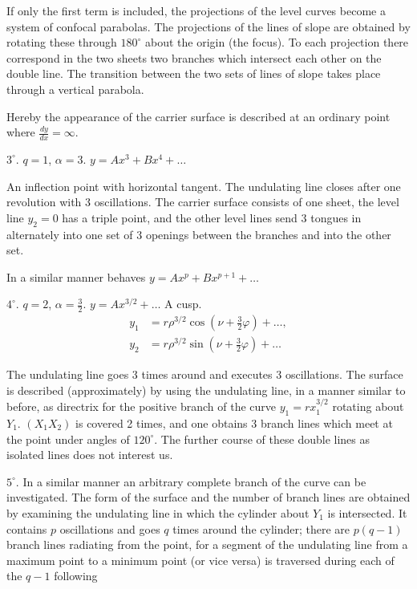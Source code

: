 \documentclass{article}
\begin{document}
If only the first term is included, the projections of the level curves become a system of confocal parabolas. The projections of the lines of slope are obtained by rotating these through $180^\circ$ about the origin (the focus). To each projection there correspond in the two sheets two branches which intersect each other on the double line. The transition between the two sets of lines of slope takes place through a vertical parabola.

Hereby the appearance of the carrier surface is described at an ordinary point where $\frac{dy}{dx} = \infty$.

$3^\circ$. $q = 1$, $\alpha = 3$. $y = A x^3 + B x^4 + \dots$

An inflection point with horizontal tangent. The undulating line closes after one revolution with 3 oscillations. The carrier surface consists of one sheet, the level line $y_2 = 0$ has a triple point, and the other level lines send 3 tongues in alternately into one set of 3 openings between the branches and into the other set.

In a similar manner behaves $y = A x^p + B x^{p+1} + \dots$

$4^\circ$. $q = 2$, $\alpha = \frac{3}{2}$. $y = A x^{3/2} + \dots$ A cusp.
\[
\begin{aligned}
y_1 &= r \rho^{3/2} \cos \left(\nu + \frac{3}{2}\varphi\right) + \dots, \\
y_2 &= r \rho^{3/2} \sin \left(\nu + \frac{3}{2}\varphi\right) + \dots
\end{aligned}
\]

The undulating line goes 3 times around and executes 3 oscillations. The surface is described (approximately) by using the undulating line, in a manner similar to before, as directrix for the positive branch of the curve $y_1 = r x_1^{3/2}$ rotating about $Y_1$. $(X_1 X_2)$ is covered 2 times, and one obtains 3 branch lines which meet at the point under angles of $120^\circ$. The further course of these double lines as isolated lines does not interest us.

$5^\circ$. In a similar manner an arbitrary complete branch of the curve can be investigated. The form of the surface and the number of branch lines are obtained by examining the undulating line in which the cylinder about $Y_1$ is intersected. It contains $p$ oscillations and goes $q$ times around the cylinder; there are $p(q - 1)$ branch lines radiating from the point, for a segment of the undulating line from a maximum point to a minimum point (or vice versa) is traversed during each of the $q - 1$ following
\end{document}
